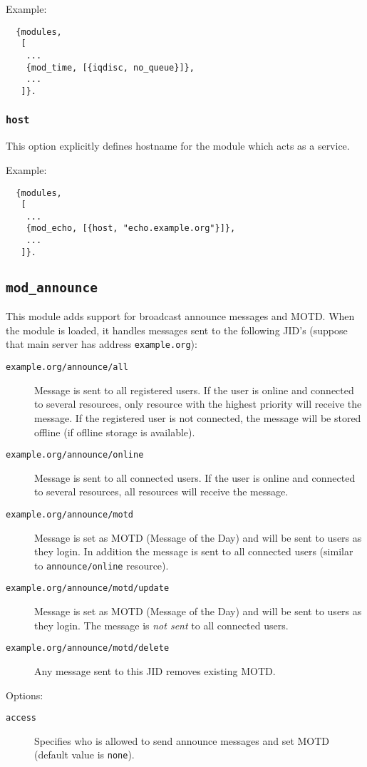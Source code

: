 \documentclass[a4paper,10pt]{article}
\newcommand{\bracehack}{\def\{{\char"7B}\def\}{\char"7D}}
\newcommand{\jid}[1]{\texttt{#1}}
\newcommand{\option}[1]{\texttt{#1}}
\newcommand{\term}[1]{\texttt{#1}}
\newcommand{\module}[1]{\texttt{#1}}
\newcommand{\modannounce}{\module{mod\_announce}}
\newcommand{\titem}[1]{\item[\bracehack\texttt{#1}]}
\begin{document}
Example:
\begin{verbatim}
  {modules,
   [
    ...
    {mod_time, [{iqdisc, no_queue}]},
    ...
   ]}.
\end{verbatim}

\subsubsection{\option{host}}
\label{sec:modhostoption}

This option explicitly defines hostname for the module which acts as a service.

Example:
\begin{verbatim}
  {modules,
   [
    ...
    {mod_echo, [{host, "echo.example.org"}]},
    ...
   ]}.
\end{verbatim}


\subsection{\modannounce{}}
\label{sec:modannounce}

This module adds support for broadcast announce messages and MOTD.
When the module is loaded, it handles messages sent to the following JID's
(suppose that main server has address \jid{example.org}):
\begin{description}
\titem{example.org/announce/all} Message is sent to all registered users.
If the user is online and connected to several resources, only resource with
the highest priority will receive the message. If the registered user is
not connected, the message will be stored offline (if oflline storage is
available).
\titem{example.org/announce/online} Message is sent to all connected users.
If the user is online and connected to several resources, all resources
will receive the message.
\titem{example.org/announce/motd} Message is set as MOTD (Message of the Day)
and will be sent to users as they login. In addition the message is sent to
all connected users (similar to \term{announce/online} resource).
\titem{example.org/announce/motd/update} Message is set as MOTD (Message of the Day)
and will be sent to users as they login. The message is \emph{not sent} to
all connected users.
\titem{example.org/announce/motd/delete} Any message sent to this JID
removes existing MOTD.
\end{description}

Options:
\begin{description}
\titem{access} Specifies who is allowed to send announce messages
and set MOTD (default value is \term{none}).
\end{description}
\end{document}
